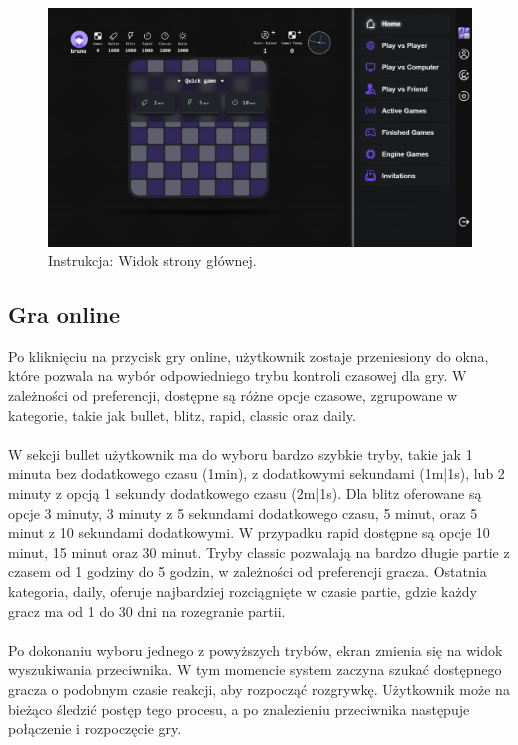 \documentclass[12pt,a4paper]{article}
\begin{document}
\vspace{0.5cm}
\begin{figure}[h!]
    \centering
    \includegraphics[width=1\textwidth]{images/ins_main.png}
    \caption{Instrukcja: Widok strony głównej.}
\end{figure}

\newpage

\subsection{Gra online}
Po kliknięciu na przycisk gry online, użytkownik zostaje przeniesiony do okna, które pozwala na wybór odpowiedniego trybu kontroli czasowej dla gry. W zależności od preferencji, dostępne są różne opcje czasowe, zgrupowane w kategorie, takie jak bullet, blitz, rapid, classic oraz daily.
\\\\
W sekcji bullet użytkownik ma do wyboru bardzo szybkie tryby, takie jak 1 minuta bez dodatkowego czasu (1min), z dodatkowymi sekundami (1m|1s), lub 2 minuty z opcją 1 sekundy dodatkowego czasu (2m|1s). Dla blitz oferowane są opcje 3 minuty, 3 minuty z 5 sekundami dodatkowego czasu, 5 minut, oraz 5 minut z 10 sekundami dodatkowymi. W przypadku rapid dostępne są opcje 10 minut, 15 minut oraz 30 minut. Tryby classic pozwalają na bardzo długie partie z czasem od 1 godziny do 5 godzin, w zależności od preferencji gracza. Ostatnia kategoria, daily, oferuje najbardziej rozciągnięte w czasie partie, gdzie każdy gracz ma od 1 do 30 dni na rozegranie partii.
\\\\
Po dokonaniu wyboru jednego z powyższych trybów, ekran zmienia się na widok wyszukiwania przeciwnika. W tym momencie system zaczyna szukać dostępnego gracza o podobnym czasie reakcji, aby rozpocząć rozgrywkę. Użytkownik może na bieżąco śledzić postęp tego procesu, a po znalezieniu przeciwnika następuje połączenie i rozpoczęcie gry.
\end{document}
